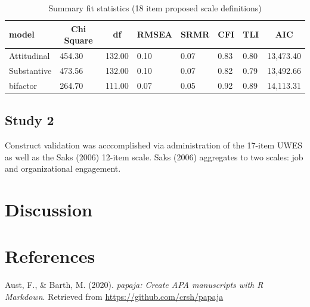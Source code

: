 \documentclass[
  english,
  man]{apa6}
\begin{document}
\begin{table}[tbp]

\begin{center}
\begin{threeparttable}

\caption{\label{tab:fitmeasures}Summary fit statistics (18 item proposed scale definitions)}

\begin{tabular}{llllllll}
\toprule
model & \multicolumn{1}{c}{Chi Square} & \multicolumn{1}{c}{df} & \multicolumn{1}{c}{RMSEA} & \multicolumn{1}{c}{SRMR} & \multicolumn{1}{c}{CFI} & \multicolumn{1}{c}{TLI} & \multicolumn{1}{c}{AIC}\\
\midrule
Attitudinal & 454.30 & 132.00 & 0.10 & 0.07 & 0.83 & 0.80 & 13,473.40\\
Substantive & 473.56 & 132.00 & 0.10 & 0.07 & 0.82 & 0.79 & 13,492.66\\
bifactor & 264.70 & 111.00 & 0.07 & 0.05 & 0.92 & 0.89 & 14,113.31\\
\bottomrule
\end{tabular}

\end{threeparttable}
\end{center}

\end{table}

\hypertarget{study-2}{%
\subsection{Study 2}\label{study-2}}

Construct validation was acccomplished via administration of the 17-item UWES as well as the Saks (2006) 12-item scale. Saks (2006) aggregates to two scales: job and organizational engagement.

\hypertarget{discussion}{%
\section{Discussion}\label{discussion}}

\newpage

\hypertarget{references}{%
\section{References}\label{references}}

\begingroup
\setlength{\parindent}{-0.5in}
\setlength{\leftskip}{0.5in}

\hypertarget{refs}{}
\leavevmode\hypertarget{ref-R-papaja}{}%
Aust, F., \& Barth, M. (2020). \emph{papaja: Create APA manuscripts with R Markdown}. Retrieved from \url{https://github.com/crsh/papaja}
\end{document}
